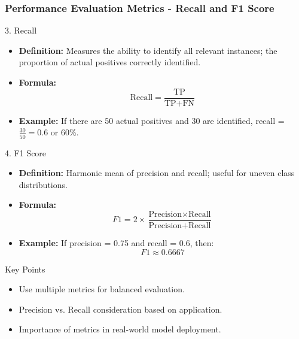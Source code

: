 \documentclass[aspectratio=169]{beamer}
\begin{document}
\begin{frame}[fragile]
    \frametitle{Performance Evaluation Metrics - Recall and F1 Score}
    \begin{block}{3. Recall}
        \begin{itemize}
            \item \textbf{Definition:} Measures the ability to identify all relevant instances; the proportion of actual positives correctly identified.
            \item \textbf{Formula:}
            \begin{equation}
            \text{Recall} = \frac{\text{TP}}{\text{TP} + \text{FN}}
            \end{equation}
            \item \textbf{Example:} If there are 50 actual positives and 30 are identified, recall = \(\frac{30}{50} = 0.6\) or 60\%.
        \end{itemize}
    \end{block}

    \begin{block}{4. F1 Score}
        \begin{itemize}
            \item \textbf{Definition:} Harmonic mean of precision and recall; useful for uneven class distributions.
            \item \textbf{Formula:}
            \begin{equation}
            F1 = 2 \times \frac{\text{Precision} \times \text{Recall}}{\text{Precision} + \text{Recall}}
            \end{equation}
            \item \textbf{Example:} If precision = 0.75 and recall = 0.6, then:
            \begin{equation}
            F1 \approx 0.6667
            \end{equation}
        \end{itemize}
    \end{block}

    \begin{block}{Key Points}
        \begin{itemize}
            \item Use multiple metrics for balanced evaluation.
            \item Precision vs. Recall consideration based on application.
            \item Importance of metrics in real-world model deployment.
        \end{itemize}
    \end{block}
\end{frame}
\end{document}
